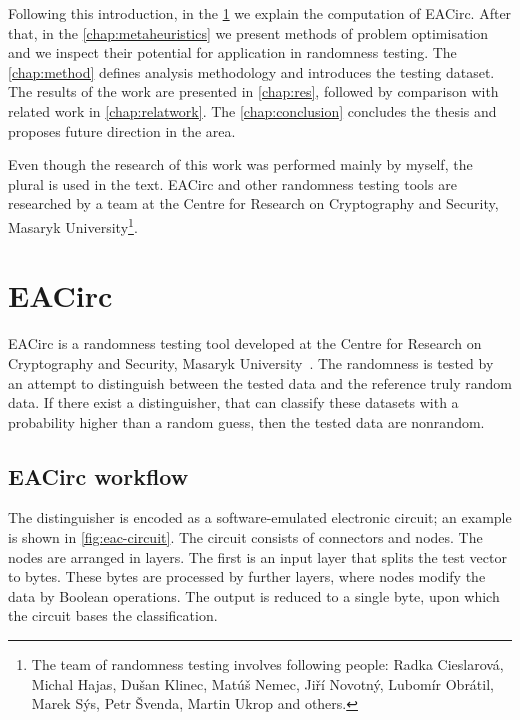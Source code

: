 \documentclass[
  print, %
  Table,   %
  nolof,     %
  nolot,     %
  11pt, %
  oneside  %
]{fithesis3}
\begin{document}
Following this introduction, in the \cref{chap:eacirc} we explain the computation of EACirc. After that, in the \cref{chap:metaheuristics} we present methods of problem optimisation and we inspect their potential for application in randomness testing. The \cref{chap:method} defines analysis methodology and introduces the testing dataset. The results of the work are presented in \cref{chap:res}, followed by comparison with related work in \cref{chap:relatwork}. The \cref{chap:conclusion} concludes the thesis and proposes future direction in the area. %

Even though the research of this work was performed mainly by myself, the plural is used in the text. EACirc and other randomness testing tools are researched by a team at the Centre for Research on Cryptography and Security, Masaryk University\footnote{The team of randomness testing involves following people: Radka Cieslarová, Michal Hajas, Dušan Klinec, Matúš Nemec, Jiří Novotný, Lubomír Obrátil, Marek Sýs, Petr Švenda, Martin Ukrop and others.}.



\chapter{EACirc}
\label{chap:eacirc}

EACirc is a randomness testing tool developed at the Centre for Research on Cryptography and Security, Masaryk University~\cite{EACirc}. The randomness is tested by an attempt to distinguish between the tested data and the reference truly random data. If there exist a distinguisher, that can classify these datasets with a probability higher than a random guess, then the tested data are nonrandom.

\section{EACirc workflow}
\label{sec:eac-comp}

The distinguisher is encoded as a software-emulated electronic circuit; an example is shown in \cref{fig:eac-circuit}. The circuit consists of connectors and nodes. The nodes are arranged in layers. The first is an input layer that splits the test vector to bytes. These bytes are processed by further layers, where nodes modify the data by Boolean operations. The output is reduced to a single byte, upon which the circuit bases the classification.
\end{document}
